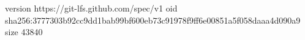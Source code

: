 version https://git-lfs.github.com/spec/v1
oid sha256:3777303b92cc9dd1bab99bf600eb73c91978f9ff6e00851a5f058daaa4d090a9
size 43840
